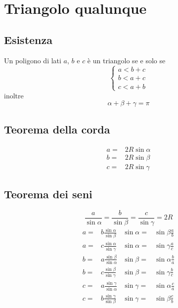 \section{Triangolo qualunque}
\subsection{Esistenza}
Un poligono di lati $a$, $b$ e $c$ è un triangolo se e solo se
\[
\begin{cases}
a<b+c\\
b<a+c\\
c<a+b
\end{cases}
\]
inoltre
\begin{equation*}
\alpha+\beta+\gamma=\pi
\end{equation*}
{\centering
	
	\par}
\subsection{Teorema della corda}
\begin{align*}
a=&2R\sin\alpha\\
b=&2R\sin\beta\\
c=&2R\sin\gamma
\end{align*}
\subsection{Teorema dei seni}
\begin{equation*}
\dfrac{a}{\sin\alpha}=\dfrac{b}{\sin\beta}=\dfrac{c}{\sin\gamma}=2R
\end{equation*}
\begin{align*}
a=&b\frac{\sin\alpha}{\sin\beta}&\sin\alpha=&\sin\beta\frac{a}{b}\\
a=&c\frac{\sin\alpha}{\sin\gamma}&\sin\alpha=&\sin\gamma\frac{a}{c}\\
b=&a\frac{\sin\beta}{\sin\alpha}&\sin\beta=&\sin\alpha\frac{b}{a}\\
b=&c\frac{\sin\beta}{\sin\gamma}&\sin\beta=&\sin\gamma\frac{b}{c}\\
c=&a\frac{\sin\gamma}{\sin\alpha}&\sin\gamma=&\sin\alpha\frac{c}{a}\\
c=&b\frac{\sin\gamma}{\sin\beta}&\sin\gamma=&\sin\beta\frac{c}{b}\\
\end{align*}
